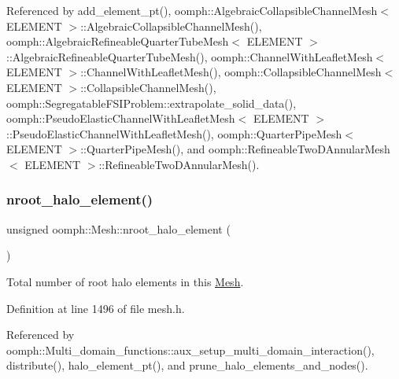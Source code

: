 Referenced by add\+\_\+element\+\_\+pt(), oomph\+::\+Algebraic\+Collapsible\+Channel\+Mesh$<$ E\+L\+E\+M\+E\+N\+T $>$\+::\+Algebraic\+Collapsible\+Channel\+Mesh(), oomph\+::\+Algebraic\+Refineable\+Quarter\+Tube\+Mesh$<$ E\+L\+E\+M\+E\+N\+T $>$\+::\+Algebraic\+Refineable\+Quarter\+Tube\+Mesh(), oomph\+::\+Channel\+With\+Leaflet\+Mesh$<$ E\+L\+E\+M\+E\+N\+T $>$\+::\+Channel\+With\+Leaflet\+Mesh(), oomph\+::\+Collapsible\+Channel\+Mesh$<$ E\+L\+E\+M\+E\+N\+T $>$\+::\+Collapsible\+Channel\+Mesh(), oomph\+::\+Segregatable\+F\+S\+I\+Problem\+::extrapolate\+\_\+solid\+\_\+data(), oomph\+::\+Pseudo\+Elastic\+Channel\+With\+Leaflet\+Mesh$<$ E\+L\+E\+M\+E\+N\+T $>$\+::\+Pseudo\+Elastic\+Channel\+With\+Leaflet\+Mesh(), oomph\+::\+Quarter\+Pipe\+Mesh$<$ E\+L\+E\+M\+E\+N\+T $>$\+::\+Quarter\+Pipe\+Mesh(), and oomph\+::\+Refineable\+Two\+D\+Annular\+Mesh$<$ E\+L\+E\+M\+E\+N\+T $>$\+::\+Refineable\+Two\+D\+Annular\+Mesh().

\mbox{\label{classoomph_1_1Mesh_afeb339ee6659e611aee6b0d6fed99c9a}} 
\subsubsection{\texorpdfstring{nroot\+\_\+halo\+\_\+element()}{nroot\_halo\_element()}\hspace{0.1cm}{\footnotesize\ttfamily [1/2]}}
{\footnotesize\ttfamily unsigned oomph\+::\+Mesh\+::nroot\+\_\+halo\+\_\+element (\begin{DoxyParamCaption}{ }\end{DoxyParamCaption})\hspace{0.3cm}{\ttfamily [inline]}}



Total number of root halo elements in this \hyperlink{classoomph_1_1Mesh}{Mesh}. 



Definition at line 1496 of file mesh.\+h.



Referenced by oomph\+::\+Multi\+\_\+domain\+\_\+functions\+::aux\+\_\+setup\+\_\+multi\+\_\+domain\+\_\+interaction(), distribute(), halo\+\_\+element\+\_\+pt(), and prune\+\_\+halo\+\_\+elements\+\_\+and\+\_\+nodes().

\mbox{\label{classoomph_1_1Mesh_a8c11d3e3efa12c90bfbf08c2c356585a}} 
